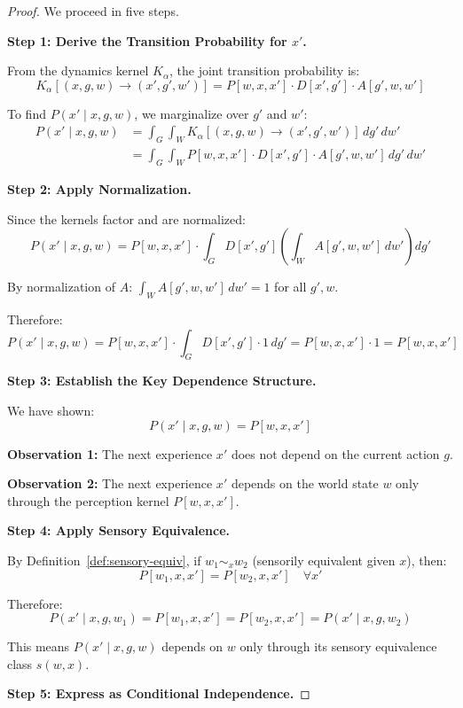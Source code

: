 \documentclass[11pt,a4paper]{article}
\theoremstyle{definition}
\theoremstyle{plain}
\theoremstyle{remark}
\begin{document}
\begin{proof}
We proceed in five steps.

\textbf{Step 1: Derive the Transition Probability for $x'$.}

From the dynamics kernel $K_\alpha$, the joint transition probability is:
\[
K_\alpha[(x, g, w) \to (x', g', w')] = P[w, x, x'] \cdot D[x', g'] \cdot A[g', w, w']
\]

To find $P(x' \mid x, g, w)$, we marginalize over $g'$ and $w'$:
\begin{align*}
P(x' \mid x, g, w) &= \int_G \int_W K_\alpha[(x, g, w) \to (x', g', w')] \, dg' \, dw' \\
&= \int_G \int_W P[w, x, x'] \cdot D[x', g'] \cdot A[g', w, w'] \, dg' \, dw'
\end{align*}

\textbf{Step 2: Apply Normalization.}

Since the kernels factor and are normalized:
\[
P(x' \mid x, g, w) = P[w, x, x'] \cdot \int_G D[x', g'] \left( \int_W A[g', w, w'] \, dw' \right) dg'
\]

By normalization of $A$: $\int_W A[g', w, w'] \, dw' = 1$ for all $g', w$.

Therefore:
\[
P(x' \mid x, g, w) = P[w, x, x'] \cdot \int_G D[x', g'] \cdot 1 \, dg' = P[w, x, x'] \cdot 1 = P[w, x, x']
\]

\textbf{Step 3: Establish the Key Dependence Structure.}

We have shown:
\begin{equation}\label{eq:key-dependence}
P(x' \mid x, g, w) = P[w, x, x']
\end{equation}

\textbf{Observation 1:} The next experience $x'$ does not depend on the current action $g$.

\textbf{Observation 2:} The next experience $x'$ depends on the world state $w$ only through the perception kernel $P[w, x, x']$.

\textbf{Step 4: Apply Sensory Equivalence.}

By Definition~\ref{def:sensory-equiv}, if $w_1 \sim_x w_2$ (sensorily equivalent given $x$), then:
\[
P[w_1, x, x'] = P[w_2, x, x'] \quad \forall x'
\]

Therefore:
\[
P(x' \mid x, g, w_1) = P[w_1, x, x'] = P[w_2, x, x'] = P(x' \mid x, g, w_2)
\]

This means $P(x' \mid x, g, w)$ depends on $w$ only through its sensory equivalence class $s(w, x)$.

\textbf{Step 5: Express as Conditional Independence.}


\end{proof}
\end{document}
